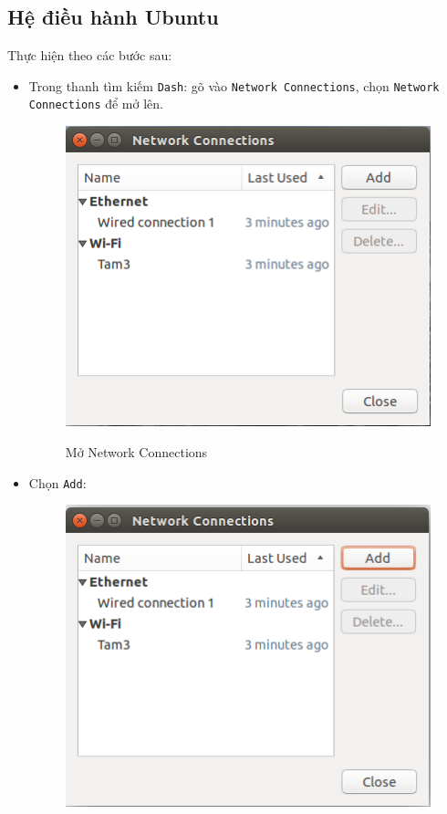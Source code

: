 \subsection{Hệ điều hành Ubuntu}
Thực hiện theo các bước sau:
\begin{itemize}
\item Trong thanh tìm kiếm \verb|Dash|: gõ vào \verb|Network Connections|, chọn \verb|Network Connections| để mở lên.
\begin{figure}[!h]
\begin{center}
{\includegraphics[scale=.5]{network/images/share-wifi-1}}
\end{center}
\caption{Mở \textsf{Network Connections}}
\end{figure}
\item Chọn \verb|Add|:
\begin{figure}[!h]
\begin{center}
{\includegraphics[scale=.5]{network/images/share-wifi-2}}

\end{center}
\end{figure}
\end{itemize}
